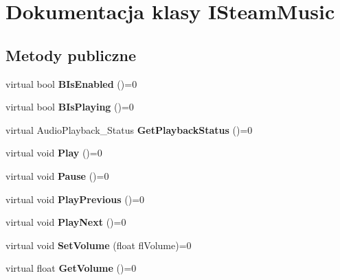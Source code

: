 \hypertarget{class_i_steam_music}{}\section{Dokumentacja klasy I\+Steam\+Music}
\label{class_i_steam_music}
\subsection*{Metody publiczne}
\begin{DoxyCompactItemize}
\item 
\mbox{\label{class_i_steam_music_a5e67a1fa14f11e4c0f1ae5d4985e1ac4}} 
virtual bool {\bfseries B\+Is\+Enabled} ()=0
\item 
\mbox{\label{class_i_steam_music_adf9328735053c6fab810902684747fdf}} 
virtual bool {\bfseries B\+Is\+Playing} ()=0
\item 
\mbox{\label{class_i_steam_music_a7f6465dd0f371f6eb0f339a2deb51169}} 
virtual Audio\+Playback\+\_\+\+Status {\bfseries Get\+Playback\+Status} ()=0
\item 
\mbox{\label{class_i_steam_music_ad5813f41835eb110d34b3f04d9fb8932}} 
virtual void {\bfseries Play} ()=0
\item 
\mbox{\label{class_i_steam_music_a966ffee67d60baf0212bea5eb31a22af}} 
virtual void {\bfseries Pause} ()=0
\item 
\mbox{\label{class_i_steam_music_a6dc97f6bfe5be385b0aa4b8d9103ab94}} 
virtual void {\bfseries Play\+Previous} ()=0
\item 
\mbox{\label{class_i_steam_music_ae3dc9c2f43a0ee3697a34c3c8788481e}} 
virtual void {\bfseries Play\+Next} ()=0
\item 
\mbox{\label{class_i_steam_music_ab6bb839b350ef10ce740fd86a7cbf3f8}} 
virtual void {\bfseries Set\+Volume} (float fl\+Volume)=0
\item 
\mbox{\label{class_i_steam_music_a8e8b571c3bd8d6ac02ef09a838997ac1}} 
virtual float {\bfseries Get\+Volume} ()=0
\end{DoxyCompactItemize}


